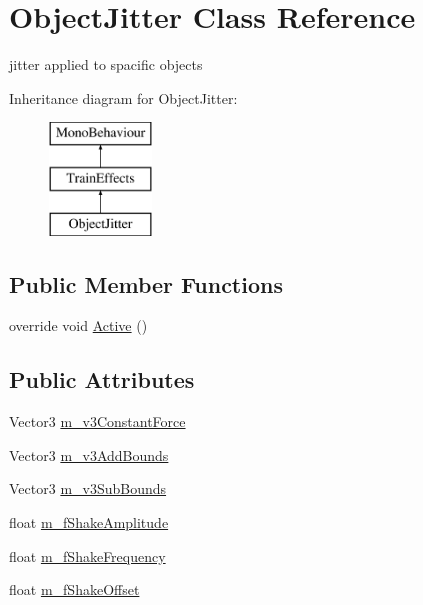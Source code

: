 \hypertarget{class_object_jitter}{}\section{Object\+Jitter Class Reference}
\label{class_object_jitter}


jitter applied to spacific objects  


Inheritance diagram for Object\+Jitter\+:\begin{figure}[H]
\begin{center}
\leavevmode
\includegraphics[height=3.000000cm]{class_object_jitter}
\end{center}
\end{figure}
\subsection*{Public Member Functions}
\begin{DoxyCompactItemize}
\item 
override void \mbox{\hyperlink{class_object_jitter_a77b8c9264b6894a2971d1b716590e159}{Active}} ()
\end{DoxyCompactItemize}
\subsection*{Public Attributes}
\begin{DoxyCompactItemize}
\item 
Vector3 \mbox{\hyperlink{class_object_jitter_aaa4e3126ee04945d77ecb5d9c8b7bfb4}{m\+\_\+v3\+Constant\+Force}}
\item 
Vector3 \mbox{\hyperlink{class_object_jitter_a924bcad8ab3be0e7e6b1ec1f2dd7628e}{m\+\_\+v3\+Add\+Bounds}}
\item 
Vector3 \mbox{\hyperlink{class_object_jitter_acf1ee4109e75ceecca410973841b5aab}{m\+\_\+v3\+Sub\+Bounds}}
\item 
float \mbox{\hyperlink{class_object_jitter_aa0f708a987f78fc44b8db566765e459a}{m\+\_\+f\+Shake\+Amplitude}}
\item 
float \mbox{\hyperlink{class_object_jitter_af78966e4ee8edad95ad395c390593d45}{m\+\_\+f\+Shake\+Frequency}}
\item 
float \mbox{\hyperlink{class_object_jitter_aee9ecc5e11f90787a2102d2b7a526bbe}{m\+\_\+f\+Shake\+Offset}}
\end{DoxyCompactItemize}
